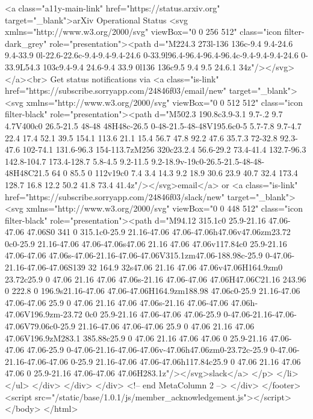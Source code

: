               <a class="a11y-main-link" href="https://status.arxiv.org" target="_blank">arXiv Operational Status <svg xmlns="http://www.w3.org/2000/svg" viewBox="0 0 256 512" class="icon filter-dark_grey" role="presentation"><path d="M224.3 273l-136 136c-9.4 9.4-24.6 9.4-33.9 0l-22.6-22.6c-9.4-9.4-9.4-24.6 0-33.9l96.4-96.4-96.4-96.4c-9.4-9.4-9.4-24.6 0-33.9L54.3 103c9.4-9.4 24.6-9.4 33.9 0l136 136c9.5 9.4 9.5 24.6.1 34z"/></svg></a><br>
              Get status notifications via
              <a class="is-link" href="https://subscribe.sorryapp.com/24846f03/email/new" target="_blank"><svg xmlns="http://www.w3.org/2000/svg" viewBox="0 0 512 512" class="icon filter-black" role="presentation"><path d="M502.3 190.8c3.9-3.1 9.7-.2 9.7 4.7V400c0 26.5-21.5 48-48 48H48c-26.5 0-48-21.5-48-48V195.6c0-5 5.7-7.8 9.7-4.7 22.4 17.4 52.1 39.5 154.1 113.6 21.1 15.4 56.7 47.8 92.2 47.6 35.7.3 72-32.8 92.3-47.6 102-74.1 131.6-96.3 154-113.7zM256 320c23.2.4 56.6-29.2 73.4-41.4 132.7-96.3 142.8-104.7 173.4-128.7 5.8-4.5 9.2-11.5 9.2-18.9v-19c0-26.5-21.5-48-48-48H48C21.5 64 0 85.5 0 112v19c0 7.4 3.4 14.3 9.2 18.9 30.6 23.9 40.7 32.4 173.4 128.7 16.8 12.2 50.2 41.8 73.4 41.4z"/></svg>email</a>
              or <a class="is-link" href="https://subscribe.sorryapp.com/24846f03/slack/new" target="_blank"><svg xmlns="http://www.w3.org/2000/svg" viewBox="0 0 448 512" class="icon filter-black" role="presentation"><path d="M94.12 315.1c0 25.9-21.16 47.06-47.06 47.06S0 341 0 315.1c0-25.9 21.16-47.06 47.06-47.06h47.06v47.06zm23.72 0c0-25.9 21.16-47.06 47.06-47.06s47.06 21.16 47.06 47.06v117.84c0 25.9-21.16 47.06-47.06 47.06s-47.06-21.16-47.06-47.06V315.1zm47.06-188.98c-25.9 0-47.06-21.16-47.06-47.06S139 32 164.9 32s47.06 21.16 47.06 47.06v47.06H164.9zm0 23.72c25.9 0 47.06 21.16 47.06 47.06s-21.16 47.06-47.06 47.06H47.06C21.16 243.96 0 222.8 0 196.9s21.16-47.06 47.06-47.06H164.9zm188.98 47.06c0-25.9 21.16-47.06 47.06-47.06 25.9 0 47.06 21.16 47.06 47.06s-21.16 47.06-47.06 47.06h-47.06V196.9zm-23.72 0c0 25.9-21.16 47.06-47.06 47.06-25.9 0-47.06-21.16-47.06-47.06V79.06c0-25.9 21.16-47.06 47.06-47.06 25.9 0 47.06 21.16 47.06 47.06V196.9zM283.1 385.88c25.9 0 47.06 21.16 47.06 47.06 0 25.9-21.16 47.06-47.06 47.06-25.9 0-47.06-21.16-47.06-47.06v-47.06h47.06zm0-23.72c-25.9 0-47.06-21.16-47.06-47.06 0-25.9 21.16-47.06 47.06-47.06h117.84c25.9 0 47.06 21.16 47.06 47.06 0 25.9-21.16 47.06-47.06 47.06H283.1z"/></svg>slack</a>
            </p>
          </li>
        </ul>
      </div>
    </div>
  </div> <!-- end MetaColumn 2 -->
</div>  </footer>
  <script src="/static/base/1.0.1/js/member_acknowledgement.js"></script>
  </body>
</html>